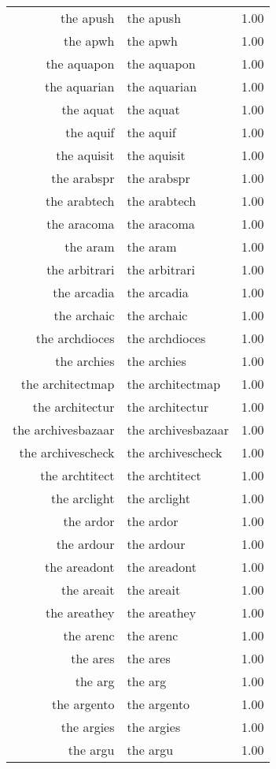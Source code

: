 \begin{table}[ht]
\begin{tabular}{rlr}
  the apush & the apush & 1.00 \\ 
  the apwh & the apwh & 1.00 \\ 
  the aquapon & the aquapon & 1.00 \\ 
  the aquarian & the aquarian & 1.00 \\ 
  the aquat & the aquat & 1.00 \\ 
  the aquif & the aquif & 1.00 \\ 
  the aquisit & the aquisit & 1.00 \\ 
  the arabspr & the arabspr & 1.00 \\ 
  the arabtech & the arabtech & 1.00 \\ 
  the aracoma & the aracoma & 1.00 \\ 
  the aram & the aram & 1.00 \\ 
  the arbitrari & the arbitrari & 1.00 \\ 
  the arcadia & the arcadia & 1.00 \\ 
  the archaic & the archaic & 1.00 \\ 
  the archdioces & the archdioces & 1.00 \\ 
  the archies & the archies & 1.00 \\ 
  the architectmap & the architectmap & 1.00 \\ 
  the architectur & the architectur & 1.00 \\ 
  the archivesbazaar & the archivesbazaar & 1.00 \\ 
  the archivescheck & the archivescheck & 1.00 \\ 
  the archtitect & the archtitect & 1.00 \\ 
  the arclight & the arclight & 1.00 \\ 
  the ardor & the ardor & 1.00 \\ 
  the ardour & the ardour & 1.00 \\ 
  the areadont & the areadont & 1.00 \\ 
  the areait & the areait & 1.00 \\ 
  the areathey & the areathey & 1.00 \\ 
  the arenc & the arenc & 1.00 \\ 
  the ares & the ares & 1.00 \\ 
  the arg & the arg & 1.00 \\ 
  the argento & the argento & 1.00 \\ 
  the argies & the argies & 1.00 \\ 
  the argu & the argu & 1.00 \\ 

\end{tabular}
\end{table}
